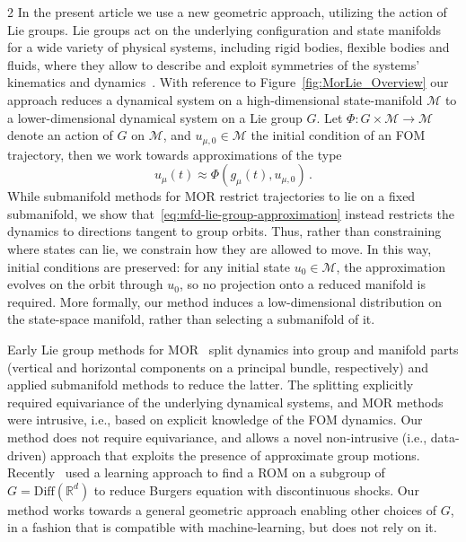 \documentclass{article}
\newcommand{\M}{\mathcal{M}}                                %
\newcommand{\R}{\mathbb{R}}                                 %
\newcommand{\Diff}{\mathrm{Diff}}
\begin{document}
\begin{multicols}{2}
In the present article we use a new geometric approach, utilizing the action of Lie groups. Lie groups act on the underlying configuration and state manifolds for a wide variety of physical systems, including rigid bodies, flexible bodies and fluids, where they allow to describe and exploit symmetries of the systems' kinematics and dynamics~\cite{Holm2009}. With reference to Figure~\ref{fig:MorLie_Overview} our approach reduces a dynamical system on a high-dimensional state-manifold $\M$ to a lower-dimensional dynamical system on a Lie group $G$. Let $\Phi:G\times\M\rightarrow\M$ denote an action of $G$ on $\M$, and $u_{\mu,0} \in \M$ the initial condition of an FOM trajectory, then we work towards approximations of the type
\begin{equation}\label{eq:mfd-lie-group-approximation}
    u_\mu(t) \approx \Phi(g_\mu(t),u_{\mu,0})\,.%
\end{equation}
While submanifold methods for MOR restrict trajectories to lie on a fixed submanifold, we show that~\eqref{eq:mfd-lie-group-approximation} instead restricts the dynamics to directions tangent to group orbits. Thus, rather than constraining where states can lie, we constrain how they are allowed to move. In this way, initial conditions are preserved: for any initial state $u_0 \in \M$, the approximation evolves on the orbit through $u_0$, so no projection onto a reduced manifold is required. More formally, our method induces a low-dimensional distribution on the state-space manifold, rather than selecting a submanifold of it.

Early Lie group methods for MOR~\cite{Ohlberger2013,Beyn2004,Rowley2000} split dynamics into group and manifold parts (vertical and horizontal components on a principal bundle, respectively) and applied submanifold methods to reduce the latter. The splitting explicitly required equivariance of the underlying dynamical systems, and MOR methods were intrusive, i.e., based on explicit knowledge of the FOM dynamics. Our method does not require equivariance, and allows a novel non-intrusive (i.e., data-driven) approach that exploits the presence of approximate group motions. Recently~\cite{Kleikamp2022} used a learning approach to find a ROM on a subgroup of $G = \Diff(\R^d)$ to reduce Burgers equation with discontinuous shocks. Our method works towards a general geometric approach enabling other choices of $G$, in a fashion that is compatible with machine-learning, but does not rely on it. 


\end{multicols}
\end{document}
